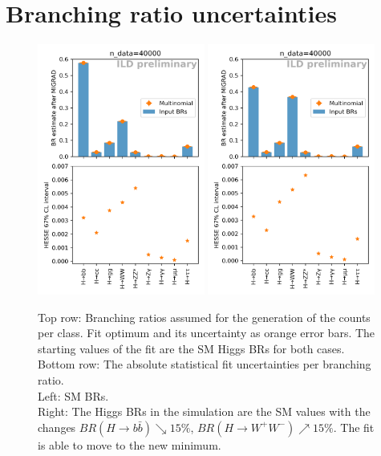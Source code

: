 \documentclass[11pt, hidelinks, a4paper]{scrartcl}
\begin{document}
\section{Branching ratio uncertainties}\label{sec:fit}
\begin{figure}[ht]
    \centering
    \includegraphics[width=0.49\textwidth, keepaspectratio]{br_estimates}
    \includegraphics[width=0.49\textwidth, keepaspectratio]{changed_br_estimates}
    \caption{
        Top row: Branching ratios assumed for the generation of the counts per class.
        Fit optimum and its uncertainty as orange error bars.
        The starting values of the fit are
        the SM Higgs BRs for both cases.
        \\
        Bottom row: The absolute statistical fit uncertainties per branching ratio.
        \\
        Left: SM BRs.
        \\
        Right: The Higgs BRs in the simulation are the SM values
        with the changes
        $BR(H \to b \bar{b}) \searrow 15\%$, $BR(H \to W^+W^-) \nearrow 15\%$.
        The fit is able to move to the new minimum.
    }\label{fig:brs}
\end{figure}
\end{document}
